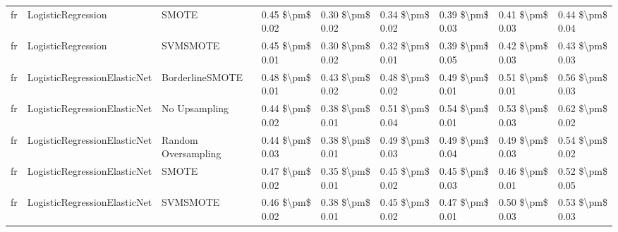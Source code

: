 \begin{tabular}{lllllllll}
      fr &              LogisticRegression &                         SMOTE &     0.45 \$\textbackslash pm\$ 0.02 &           0.30 \$\textbackslash pm\$ 0.02 &       0.34 \$\textbackslash pm\$ 0.02 &        0.39 \$\textbackslash pm\$ 0.03 &                         0.41 \$\textbackslash pm\$ 0.03 &     0.44 \$\textbackslash pm\$ 0.04 \\
      fr &              LogisticRegression &                      SVMSMOTE &     0.45 \$\textbackslash pm\$ 0.01 &           0.30 \$\textbackslash pm\$ 0.02 &       0.32 \$\textbackslash pm\$ 0.01 &        0.39 \$\textbackslash pm\$ 0.05 &                         0.42 \$\textbackslash pm\$ 0.03 &     0.43 \$\textbackslash pm\$ 0.03 \\
      fr &    LogisticRegressionElasticNet &               BorderlineSMOTE &     0.48 \$\textbackslash pm\$ 0.01 &           0.43 \$\textbackslash pm\$ 0.02 &       0.48 \$\textbackslash pm\$ 0.02 &        0.49 \$\textbackslash pm\$ 0.01 &                         0.51 \$\textbackslash pm\$ 0.01 &     0.56 \$\textbackslash pm\$ 0.03 \\
      fr &    LogisticRegressionElasticNet &                 No Upsampling &     0.44 \$\textbackslash pm\$ 0.02 &           0.38 \$\textbackslash pm\$ 0.01 &       0.51 \$\textbackslash pm\$ 0.04 &        0.54 \$\textbackslash pm\$ 0.01 &                         0.53 \$\textbackslash pm\$ 0.03 &     0.62 \$\textbackslash pm\$ 0.02 \\
      fr &    LogisticRegressionElasticNet &           Random Oversampling &     0.44 \$\textbackslash pm\$ 0.03 &           0.38 \$\textbackslash pm\$ 0.01 &       0.49 \$\textbackslash pm\$ 0.03 &        0.49 \$\textbackslash pm\$ 0.04 &                         0.49 \$\textbackslash pm\$ 0.03 &     0.54 \$\textbackslash pm\$ 0.02 \\
      fr &    LogisticRegressionElasticNet &                         SMOTE &     0.47 \$\textbackslash pm\$ 0.02 &           0.35 \$\textbackslash pm\$ 0.01 &       0.45 \$\textbackslash pm\$ 0.02 &        0.45 \$\textbackslash pm\$ 0.03 &                         0.46 \$\textbackslash pm\$ 0.01 &     0.52 \$\textbackslash pm\$ 0.05 \\
      fr &    LogisticRegressionElasticNet &                      SVMSMOTE &     0.46 \$\textbackslash pm\$ 0.02 &           0.38 \$\textbackslash pm\$ 0.01 &       0.45 \$\textbackslash pm\$ 0.02 &        0.47 \$\textbackslash pm\$ 0.01 &                         0.50 \$\textbackslash pm\$ 0.03 &     0.53 \$\textbackslash pm\$ 0.03 \\

\end{tabular}
